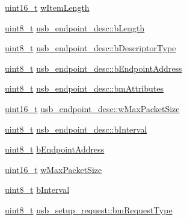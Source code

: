 \begin{DoxyCompactItemize}
\item 
\hyperlink{stdint_8h_a273cf69d639a59973b6019625df33e30}{uint16\-\_\-t} \hyperlink{group___p_i_o_s___u_s_b___d_e_f_s_ga98316a0d3fa2f9df4b6c5315b3f4c48d}{w\-Item\-Length}
\item 
\hyperlink{stdint_8h_aba7bc1797add20fe3efdf37ced1182c5}{uint8\-\_\-t} \hyperlink{group___p_i_o_s___u_s_b___d_e_f_s_ga3daed87cea9dc19fad38317f997d0623}{usb\-\_\-endpoint\-\_\-desc\-::b\-Length}
\item 
\hyperlink{stdint_8h_aba7bc1797add20fe3efdf37ced1182c5}{uint8\-\_\-t} \hyperlink{group___p_i_o_s___u_s_b___d_e_f_s_gac7354b96862dc19507c70b22d8f6da99}{usb\-\_\-endpoint\-\_\-desc\-::b\-Descriptor\-Type}
\item 
\hyperlink{stdint_8h_aba7bc1797add20fe3efdf37ced1182c5}{uint8\-\_\-t} \hyperlink{group___p_i_o_s___u_s_b___d_e_f_s_ga8ad9f61bd28c162a904025d1c3df16fb}{usb\-\_\-endpoint\-\_\-desc\-::b\-Endpoint\-Address}
\item 
\hyperlink{stdint_8h_aba7bc1797add20fe3efdf37ced1182c5}{uint8\-\_\-t} \hyperlink{group___p_i_o_s___u_s_b___d_e_f_s_gae9b9321924c915afb3ae2b6849b1d86c}{usb\-\_\-endpoint\-\_\-desc\-::bm\-Attributes}
\item 
\hyperlink{stdint_8h_a273cf69d639a59973b6019625df33e30}{uint16\-\_\-t} \hyperlink{group___p_i_o_s___u_s_b___d_e_f_s_gabf689a07ed6891470fe9f48ea36ccd02}{usb\-\_\-endpoint\-\_\-desc\-::w\-Max\-Packet\-Size}
\item 
\hyperlink{stdint_8h_aba7bc1797add20fe3efdf37ced1182c5}{uint8\-\_\-t} \hyperlink{group___p_i_o_s___u_s_b___d_e_f_s_ga7d36b247562b49fe4cc7824d9ee0894e}{usb\-\_\-endpoint\-\_\-desc\-::b\-Interval}
\item 
\hyperlink{stdint_8h_aba7bc1797add20fe3efdf37ced1182c5}{uint8\-\_\-t} \hyperlink{group___p_i_o_s___u_s_b___d_e_f_s_ga527afb0f25cdd442d8d32c7df8e18c45}{b\-Endpoint\-Address}
\item 
\hyperlink{stdint_8h_a273cf69d639a59973b6019625df33e30}{uint16\-\_\-t} \hyperlink{group___p_i_o_s___u_s_b___d_e_f_s_gabcc8edb1d5094ce6a16b42c1a7ae67d8}{w\-Max\-Packet\-Size}
\item 
\hyperlink{stdint_8h_aba7bc1797add20fe3efdf37ced1182c5}{uint8\-\_\-t} \hyperlink{group___p_i_o_s___u_s_b___d_e_f_s_gaff92277eea8536f7de1a88d818c91b9e}{b\-Interval}
\item 
\hyperlink{stdint_8h_aba7bc1797add20fe3efdf37ced1182c5}{uint8\-\_\-t} \hyperlink{group___p_i_o_s___u_s_b___d_e_f_s_ga6724d6067f78659da89e2abac5040207}{usb\-\_\-setup\-\_\-request\-::bm\-Request\-Type}
\item 

\end{DoxyCompactItemize}
